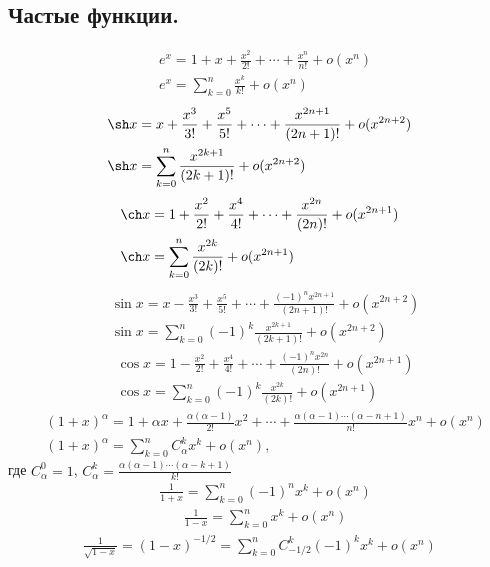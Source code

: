 \documentclass[a4paper,14pt]{article}
\begin{document}
    \subsection{Частые функции.}
    \begin{align}
        &e^x=1+x+\frac{x^2}{2!}+\cdots+\frac{x^n}{n!}+o(x^n) \nonumber \\
        &e^x=\sum_{k=0}^{n} \frac{x^k}{k!}+o(x^n)
    \end{align}
    \begin{align}
        &\sh x=x+\frac{x^3}{3!}+\frac{x^5}{5!}+\cdots+\frac{x^{2n+1}}{(2n+1)!}+o(x^{2n+2})\nonumber \\
        &\sh x=\sum_{k=0}^{n} \frac{x^{2k+1}}{(2k+1)!}+o(x^{2n+2})
    \end{align}
    \begin{align}
        &\ch x=1+\frac{x^2}{2!}+\frac{x^4}{4!}+\cdots+\frac{x^{2n}}{(2n)!}+o(x^{2n+1})\nonumber \\
        &\ch x=\sum_{k=0}^{n} \frac{x^{2k}}{(2k)!}+o(x^{2n+1})
    \end{align}
    \begin{align}
        &\sin x=x-\frac{x^3}{3!}+\frac{x^5}{5!}+\cdots+\frac{(-1)^nx^{2n+1}}{(2n+1)!}+o(x^{2n+2})\nonumber \\
        &\sin x=\sum_{k=0}^{n} (-1)^k \frac{x^{2k+1}}{(2k+1)!}+o(x^{2n+2})
    \end{align}
    \begin{align}
        &\cos x=1-\frac{x^2}{2!}+\frac{x^4}{4!}+\cdots+\frac{(-1)^nx^{2n}}{(2n)!}+o(x^{2n+1})\nonumber \\
        &\cos x=\sum_{k=0}^{n} (-1)^k \frac{x^{2k}}{(2k)!}+o(x^{2n+1})
    \end{align}
    \begin{align}
        &(1+x)^\alpha=1+\alpha x+\frac{\alpha(\alpha-1)}{2!}x^2+\cdots+\frac{\alpha(\alpha-1)\cdots(\alpha-n+1)}{n!}x^n+o(x^n)\nonumber \\
        &(1+x)^\alpha=\sum_{k=0}^{n} C_\alpha^kx^k+o(x^n),
    \end{align}
    где $C_\alpha^0=1$, $C_\alpha^k=\frac{\alpha(\alpha-1)\cdots(\alpha-k+1)}{k!}$
    \begin{align}
        &\frac{1}{1+x}=\sum_{k=0}^{n} (-1)^nx^k+o(x^n)
    \end{align}
    \begin{align}
        &\frac{1}{1-x}=\sum_{k=0}^{n} x^k+o(x^n)
    \end{align}
    \begin{align}
        \frac{1}{\sqrt{1-x}}=(1-x)^{-1/2}=\sum_{k=0}^{n} C_{-1/2}^{k} (-1)^k x^k+o(x^n)
    \end{align}
\end{document}
